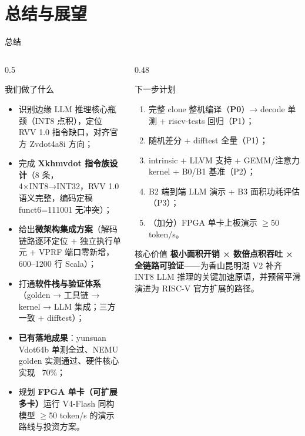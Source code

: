 \documentclass[aspectratio=169]{beamer}
\begin{document}
\section{总结与展望}

\begin{frame}{总结}
\begin{columns}[T]
\begin{column}{0.5\textwidth}
\begin{block}{我们做了什么}
\begin{itemize}\footnotesize
  \item 识别边缘 LLM 推理核心瓶颈（INT8 点积），定位 RVV 1.0 指令缺口，对齐官方 Zvdot4a8i 方向；
  \item 完成 \textbf{Xkhmvdot 指令族设计}（8 条，4×INT8→INT32，RVV 1.0 语义完整，编码定稿 funct6=111001 无冲突）；
  \item 给出\textbf{微架构集成方案}（解码链路逐环定位 + 独立执行单元 + VPRF 端口零新增，600–1200 行 Scala）；
  \item 打通\textbf{软件栈与验证体系}（golden → 工具链 → kernel → LLM 集成；三方一致 + difftest）；
  \item \textbf{已有落地成果}：yunsuan Vdot64b 单测全过、NEMU golden 实测通过、硬件核心实现 ~70\%；
  \item 规划 \textbf{FPGA 单卡（可扩展多卡）}运行 V4-Flash 同构模型 $\ge$50 token/s 的演示路线与投资方案。
\end{itemize}
\end{block}
\end{column}
\begin{column}{0.48\textwidth}
\begin{block}{下一步计划}
\begin{enumerate}\footnotesize
  \item 完整 clone 整机编译（\textbf{P0}）→ decode 单测 + riscv-tests 回归（P1）；
  \item 随机差分 + difftest 全量（P1）；
  \item intrinsic + LLVM 支持 + GEMM/注意力 kernel + B0/B1 基准（P2）；
  \item B2 端到端 LLM 演示 + B3 面积功耗评估（P3）；
  \item （加分）FPGA 单卡上板演示 $\ge$50 token/s。
\end{enumerate}
\end{block}
\begin{block}{核心价值}
\footnotesize \textbf{极小面积开销 × 数倍点积吞吐 × 全链路可验证}——为香山昆明湖 V2 补齐 INT8 LLM 推理的关键加速原语，并预留平滑演进为 RISC-V 官方扩展的路径。
\end{block}
\end{column}
\end{columns}
\end{frame}
\end{document}
